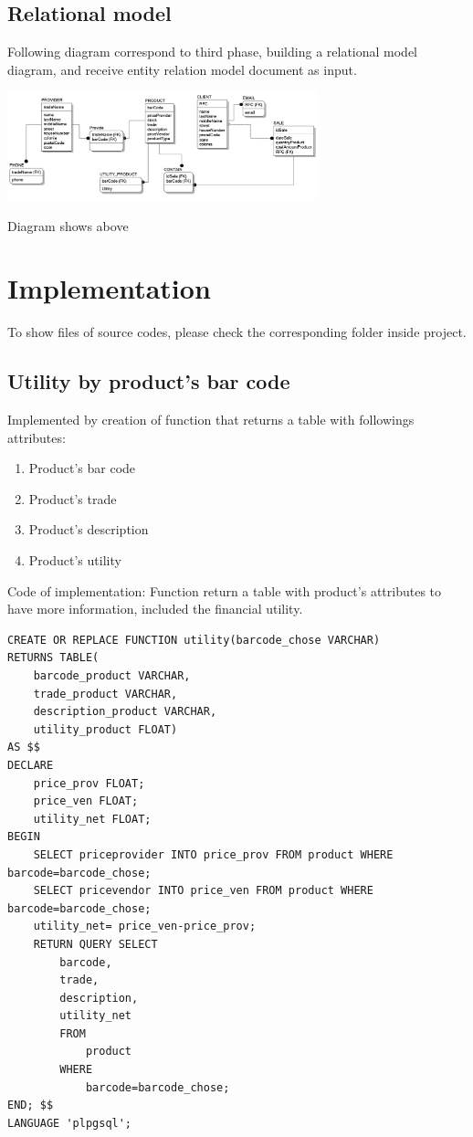 \documentclass{article}
\begin{document}
\subsection{Relational model}
Following diagram correspond to third phase, building a relational model diagram, and receive entity relation model document as input.
\begin{center}
\includegraphics[width=9cm]{mr}
\end{center}
Diagram shows above
\section{Implementation}
To show files of source codes, please check the corresponding folder inside project.
\subsection{Utility by product's bar code}
Implemented by creation of function that returns a table with followings attributes:
\begin{enumerate}
\item Product's bar code
\item Product's trade
\item Product's description
\item Product's utility
\end{enumerate}
Code of implementation: Function return a table with product's attributes to have more information, included the financial utility.
\begin{verbatim}
CREATE OR REPLACE FUNCTION utility(barcode_chose VARCHAR) 
RETURNS TABLE(
    barcode_product VARCHAR,
    trade_product VARCHAR,
    description_product VARCHAR,
    utility_product FLOAT)
AS $$
DECLARE
    price_prov FLOAT;
    price_ven FLOAT;
    utility_net FLOAT;
BEGIN
    SELECT priceprovider INTO price_prov FROM product WHERE barcode=barcode_chose;
    SELECT pricevendor INTO price_ven FROM product WHERE barcode=barcode_chose;
    utility_net= price_ven-price_prov;
    RETURN QUERY SELECT
        barcode,
        trade,
        description,
        utility_net
        FROM 
            product
        WHERE
            barcode=barcode_chose;
END; $$
LANGUAGE 'plpgsql';
\end{verbatim}
\end{document}

